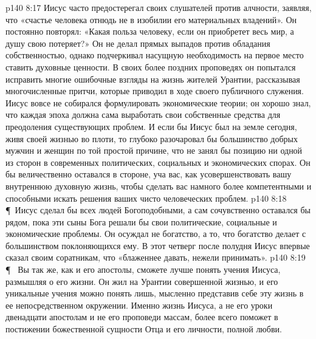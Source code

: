 \vs p140 8:17 Иисус часто предостерегал своих слушателей против алчности, заявляя, что «счастье человека отнюдь не в изобилии его материальных владений». Он постоянно повторял: «Какая польза человеку, если он приобретет весь мир, а душу свою потеряет?» Он не делал прямых выпадов против обладания собственностью, однако подчеркивал насущную необходимость на первое место ставить духовные ценности. В своих более поздних проповедях он попытался исправить многие ошибочные взгляды на жизнь жителей Урантии, рассказывая многочисленные притчи, которые приводил в ходе своего публичного служения. Иисус вовсе не собирался формулировать экономические теории; он хорошо знал, что каждая эпоха должна сама выработать свои собственные средства для преодоления существующих проблем. И если бы Иисус был на земле сегодня, живя своей жизнью во плоти, то глубоко разочаровал бы большинство добрых мужчин и женщин по той простой причине, что не занял бы позицию ни одной из сторон в современных политических, социальных и экономических спорах. Он бы величественно оставался в стороне, уча вас, как усовершенствовать вашу внутреннюю духовную жизнь, чтобы сделать вас намного более компетентными и способными искать решения ваших чисто человеческих проблем.
\vs p140 8:18 \P\ Иисус сделал бы всех людей Богоподобными, а сам сочувственно оставался бы рядом, пока эти сыны Бога решали бы свои политические, социальные и экономические проблемы. Он осуждал не богатство, а то, что богатство делает с большинством поклоняющихся ему. В этот четверг после полудня Иисус впервые сказал своим соратникам, что «блаженнее давать, нежели принимать».
\vs p140 8:19 \P\ \bibnobreakspace {} Вы так же, как и его апостолы, сможете лучше понять учения Иисуса, размышляя о его жизни. Он жил на Урантии совершенной жизнью, и его уникальные учения можно понять лишь, мысленно представив себе эту жизнь в ее непосредственном окружении. Именно жизнь Иисуса, а не его уроки двенадцати апостолам и не его проповеди массам, более всего поможет в постижении божественной сущности Отца и его личности, полной любви.
